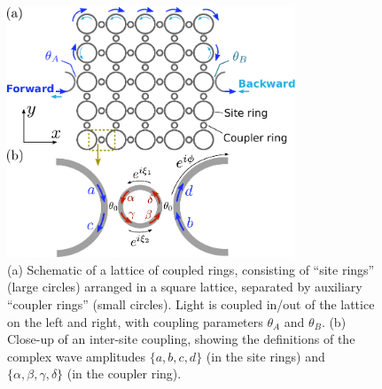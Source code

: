 \documentclass[aps,prx,twocolumn,superscriptaddress]{revtex4-1}
\newcommand{\figwidth}{8.6cm}
\begin{document}
\begin{figure}
  \centering
  \includegraphics[width=\figwidth]{fig_wy/Lattice.pdf}
  \caption{(a) Schematic of a lattice of coupled rings, consisting of ``site rings'' (large circles) arranged in a square lattice, separated by auxiliary ``coupler rings'' (small circles).  Light is coupled in/out of the lattice on the left and right, with coupling parameters $\theta_A$ and $\theta_B$.  (b) Close-up of an inter-site coupling, showing the definitions of the complex wave amplitudes $\{a, b, c, d\}$ (in the site rings) and $\{\alpha, \beta, \gamma, \delta\}$ (in the coupler ring). }
  \label{fig:ringresonators}
\end{figure}
\end{document}
